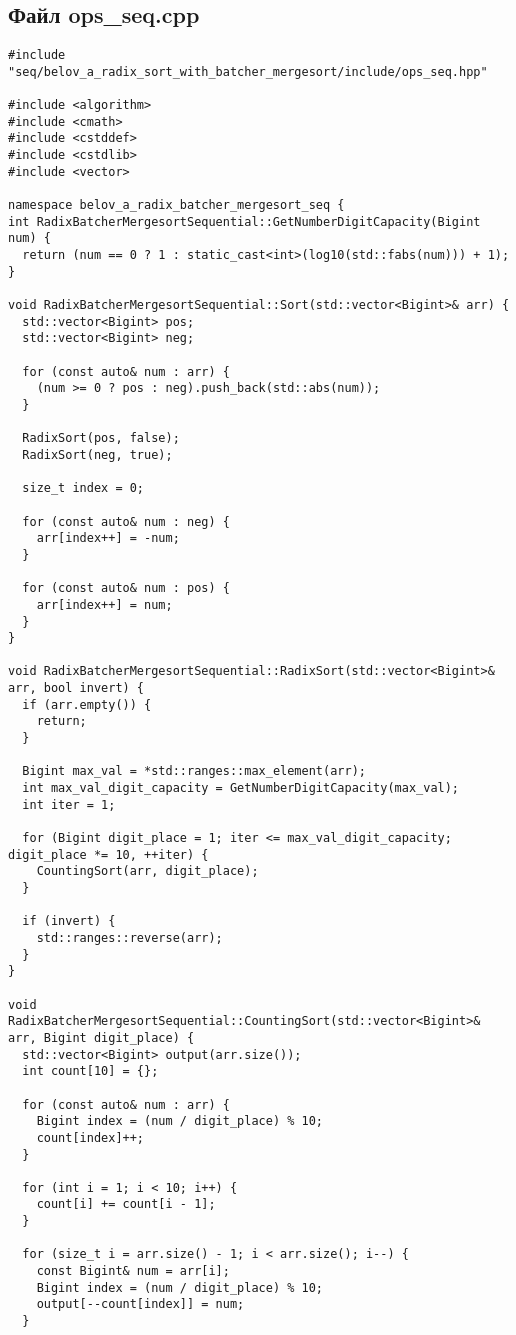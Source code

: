 \documentclass[a4paper,12pt]{article}
\begin{document}
\subsection*{Файл ops\_seq.cpp}
\begin{lstlisting}
#include "seq/belov_a_radix_sort_with_batcher_mergesort/include/ops_seq.hpp"

#include <algorithm>
#include <cmath>
#include <cstddef>
#include <cstdlib>
#include <vector>

namespace belov_a_radix_batcher_mergesort_seq {
int RadixBatcherMergesortSequential::GetNumberDigitCapacity(Bigint num) {
  return (num == 0 ? 1 : static_cast<int>(log10(std::fabs(num))) + 1);
}

void RadixBatcherMergesortSequential::Sort(std::vector<Bigint>& arr) {
  std::vector<Bigint> pos;
  std::vector<Bigint> neg;

  for (const auto& num : arr) {
    (num >= 0 ? pos : neg).push_back(std::abs(num));
  }

  RadixSort(pos, false);
  RadixSort(neg, true);

  size_t index = 0;

  for (const auto& num : neg) {
    arr[index++] = -num;
  }

  for (const auto& num : pos) {
    arr[index++] = num;
  }
}

void RadixBatcherMergesortSequential::RadixSort(std::vector<Bigint>& arr, bool invert) {
  if (arr.empty()) {
    return;
  }

  Bigint max_val = *std::ranges::max_element(arr);
  int max_val_digit_capacity = GetNumberDigitCapacity(max_val);
  int iter = 1;

  for (Bigint digit_place = 1; iter <= max_val_digit_capacity; digit_place *= 10, ++iter) {
    CountingSort(arr, digit_place);
  }

  if (invert) {
    std::ranges::reverse(arr);
  }
}

void RadixBatcherMergesortSequential::CountingSort(std::vector<Bigint>& arr, Bigint digit_place) {
  std::vector<Bigint> output(arr.size());
  int count[10] = {};

  for (const auto& num : arr) {
    Bigint index = (num / digit_place) % 10;
    count[index]++;
  }

  for (int i = 1; i < 10; i++) {
    count[i] += count[i - 1];
  }

  for (size_t i = arr.size() - 1; i < arr.size(); i--) {
    const Bigint& num = arr[i];
    Bigint index = (num / digit_place) % 10;
    output[--count[index]] = num;
  }


\end{lstlisting}
\end{document}
